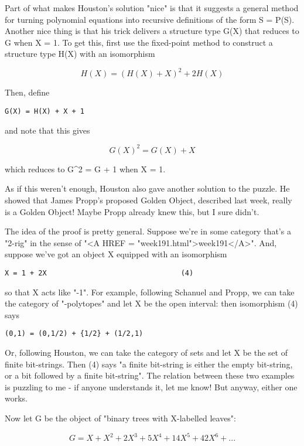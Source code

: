 Part of what makes Houston's solution "nice" is that it suggests a 
general method for turning polynomial equations into recursive definitions
of the form S = P(S).  Another nice thing is that his trick delivers 
a structure type G(X) that reduces to G when X = 1.  To get this, first 
use the fixed-point method to construct a structure type H(X) with an
isomorphism

$$
H(X) = (H(X) + X)^{2} + 2H(X)
$$
    
Then, define

\begin{verbatim}
G(X) = H(X) + X + 1 
\end{verbatim}
    
and note that this gives 

$$
G(X)^{2} = G(X) + X
$$
    
which reduces to G^{2} = G + 1 when X = 1.

As if this weren't enough, Houston also gave another solution to the
puzzle.  He showed that James Propp's proposed Golden Object, described 
last week, really is a Golden Object!  Maybe Propp already knew this, 
but I sure didn't.

The idea of the proof is pretty general.  Suppose we're in some category
that's a "2-rig" in the sense 
of "<A HREF = "week191.html">week191</A>".  And, suppose we've 
got an object X equipped with an isomorphism

\begin{verbatim}
X = 1 + 2X                                (4)
\end{verbatim}
    
so that X acts like "-1".  For example, following Schanuel and Propp, 
we can take the category of "\sigma -polytopes" and let X be the open 
interval: then isomorphism (4) says

\begin{verbatim}
(0,1) = (0,1/2) + {1/2} + (1/2,1)
\end{verbatim}
    
Or, following Houston, we can take the category of sets and let X be 
the set of finite bit-strings.  Then (4) says "a finite bit-string is 
either the empty bit-string, or a bit followed by a finite bit-string".  
The relation between these two examples is puzzling to me - if anyone
understands it, let me know!  But anyway, either one works.

Now let G be the object of "binary trees with X-labelled leaves":

$$
G = X + X^{2} + 2X^{3} + 5X^{4} + 14X^{5} + 42X^{6} + ...
$$
    
